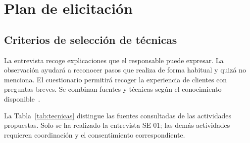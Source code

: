\section{Plan de elicitación}\label{sec:elicitacion}

\subsection{Criterios de selección de técnicas}
La entrevista recoge explicaciones que el responsable puede expresar. La observación ayudará
a reconocer pasos que realiza de forma habitual y quizá no menciona. El cuestionario permitirá
recoger la experiencia de clientes con preguntas breves. Se combinan fuentes y técnicas según
el conocimiento disponible~\cite{pohl2025,ireb2026}.

La Tabla~\ref{tab:tecnicas} distingue las fuentes consultadas de las actividades propuestas.
Solo se ha realizado la entrevista SE-01; las demás actividades requieren coordinación y el
consentimiento correspondiente.

